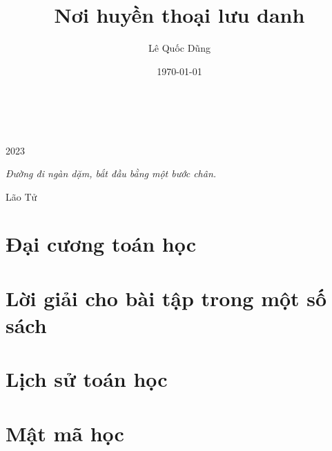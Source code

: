 \documentclass[oneside]{book}
\title{Nơi huyền thoại lưu danh}
\author{Lê Quốc Dũng}
\date{\today}
\begin{document}
\begin{titlepage}
		\\
			
		\vspace{10mm}
		\\
		\vspace{\fill}
		\centering \large{2023}
\end{titlepage}

\newpage

\vspace*{2cm}

\begin{center}
	{\Large 
			\textit{Đường đi ngàn dặm, bắt đầu bằng một bước chân.}
	}
	\Large{\parbox{10cm}{
		\begin{raggedleft}
		\vspace{.5cm}\hfill{Lão Tử}
		\end{raggedleft}
	}
}
\end{center}

\newpage

\tableofcontents

\newpage



\part{Đại cương toán học}







%





\part{Lời giải cho bài tập trong một số sách}



\part{Lịch sử toán học}


\part{Mật mã học}

\end{document}
